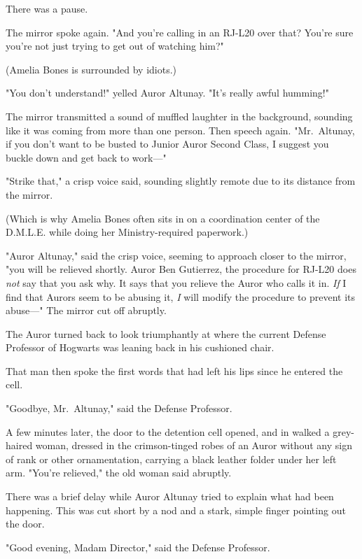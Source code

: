 There was a pause.

The mirror spoke again. "And you're calling in an RJ-L20 over that? You're sure
you're not just trying to get out of watching him?"

(Amelia Bones is surrounded by idiots.)

"You don't understand!" yelled Auror Altunay. "It's really awful humming!"

The mirror transmitted a sound of muffled laughter in the background, sounding
like it was coming from more than one person. Then speech again. "Mr.~Altunay,
if you don't want to be busted to Junior Auror Second Class, I suggest you
buckle down and get back to work---"

"Strike that," a crisp voice said, sounding slightly remote due to its distance
from the mirror.

(Which is why Amelia Bones often sits in on a coordination center of the
D.M.L.E. while doing her Ministry-required paperwork.)

"Auror Altunay," said the crisp voice, seeming to approach closer to the
mirror, "you will be relieved shortly. Auror Ben Gutierrez, the procedure for
RJ-L20 does \emph{not} say that you ask why. It says that you relieve the Auror
who calls it in. \emph{If} I find that Aurors seem to be abusing it, \emph{I}
will modify the procedure to prevent its abuse---" The mirror cut off abruptly.

The Auror turned back to look triumphantly at where the current Defense
Professor of Hogwarts was leaning back in his cushioned chair.

That man then spoke the first words that had left his lips since he entered the
cell.

"Goodbye, Mr.~Altunay," said the Defense Professor.

A few minutes later, the door to the detention cell opened, and in walked a
grey-haired woman, dressed in the crimson-tinged robes of an Auror without any
sign of rank or other ornamentation, carrying a black leather folder under her
left arm. "You're relieved," the old woman said abruptly.

There was a brief delay while Auror Altunay tried to explain what had been
happening. This was cut short by a nod and a stark, simple finger pointing out
the door.

"Good evening, Madam Director," said the Defense Professor.

